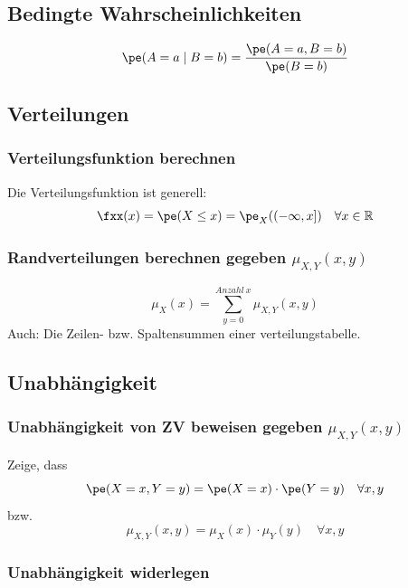 \documentclass[9pt]{article} %
\begin{document}
\tableofcontents
\newpage

\subsection{Bedingte Wahrscheinlichkeiten}
\begin{equation}
    \pe(A = a \mid B = b) = \frac{\pe(A = a, B = b)}{\pe(B= b)}
\end{equation}
\subsection{Verteilungen}
\subsubsection{Verteilungsfunktion berechnen}
Die Verteilungsfunktion ist generell:
\begin{equation}
    \fxx(x) = \pe(X \leq x) = \pe_X((-\infty, x]) \quad \forall x \in \mathbb{R}
\end{equation}
\subsubsection{Randverteilungen berechnen gegeben $\mu_{X,Y}(x,y)$}
\begin{equation}
    \mu_X(x) = \sum^{Anzahl\ x}_{y=0} \mu_{X,Y}(x,y)
\end{equation}
Auch: Die Zeilen- bzw. Spaltensummen einer verteilungstabelle. 

\subsection{Unabhängigkeit}
\subsubsection{Unabhängigkeit von ZV beweisen gegeben $\mu_{X,Y}(x,y)$}
Zeige, dass
\begin{equation}
    \pe(X=x, Y=y) = \pe(X=x) \cdot \pe(Y=y) \quad \forall x,y 
\end{equation}
bzw. 
\begin{equation}
    \mu_{X,Y}(x,y) = \mu_{X}(x) \cdot \mu_{Y}(y) \quad \forall x,y 
\end{equation}


\subsubsection{Unabhängigkeit widerlegen}
\end{document}
